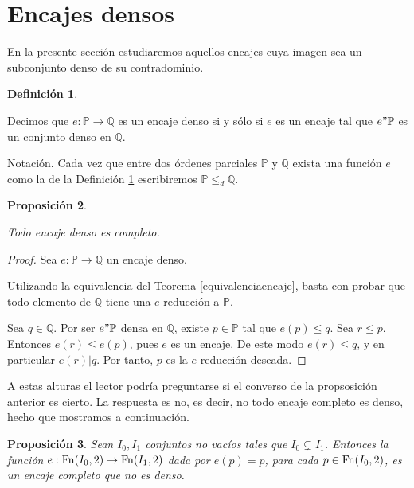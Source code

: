 \documentclass[11pt]{unam_tesis1}
\theoremstyle{MyThmStyle}
\theoremstyle{definition}
\newtheorem{definition}{Definici\'on}[chapter]
\theoremstyle{plain}
\newtheorem{proposition}[definition]{Proposici\'on}
\theoremstyle{remark}
\let\leq\leqslant
\begin{document}
\section{Encajes densos}
En la presente secci\'on estudiaremos aquellos encajes cuya imagen sea un subconjunto denso de su contradominio.

\begin{definition}\label{encajedenso}

Decimos que $e:\mathbb P \rightarrow \mathbb Q$ es un encaje denso si y s\'olo si $e$ es un encaje tal que $e"\mathbb P$ es un conjunto denso en $\mathbb Q$.

\end{definition}

Notaci\'on. Cada vez que entre dos \'ordenes parciales $\mathbb P$ y $\mathbb Q$ exista una funci\'on $e$ como la de la Definici\'on \ref{encajedenso} escribiremos $\mathbb P\leq_d \mathbb Q$.

\begin{proposition}\label{densoimplicacompleto}

Todo encaje denso es completo.

\end{proposition}

\begin{proof}
Sea $e:\mathbb P \rightarrow \mathbb Q$ un encaje denso.

Utilizando la equivalencia del Teorema \ref{equivalenciaencaje}, basta con probar que todo elemento de $\mathbb Q$ tiene una $e$-reducci\'on a $\mathbb P$. 

Sea $q\in \mathbb Q$. Por ser $e"\mathbb P$ densa en $\mathbb Q$, existe $p\in \mathbb P$ tal que $e(p)\leq q$. Sea $r\leq p$. Entonces $e(r)\leq e(p)$, pues $e$ es un encaje. De este modo $e(r)\leq q$, y en particular $e(r)|q$. Por tanto, $p$ es la $e$-reducci\'on deseada.
\end{proof}

A estas alturas el lector podr\'ia preguntarse si el converso de la propsosici\'on anterior es cierto. La respuesta es no, es decir, no todo encaje completo es denso, hecho que mostramos a continuaci\'on.

\begin{proposition}

Sean $I_0,I_1$ conjuntos no vac\'ios tales que $I_0\subsetneq I_1$. Entonces la funci\'on $e:{\rm Fn}(I_0,2) \to {\rm Fn}(I_1,2)$ dada por $e(p)=p$, para cada $p\in {\rm Fn}(I_0,2)$, es un encaje completo que no es denso.

\end{proposition}
\end{document}
